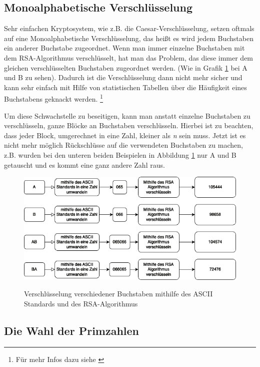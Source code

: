 \documentclass[12pt,a4paper]{scrartcl}
\begin{document}
	\subsection{Monoalphabetische Verschlüsselung}
	Sehr einfachen Kryptosystem, wie z.B. die Caesar-Verschlüsselung, setzen oftmals auf eine Monoalphabetische Verschlüsselung, das heißt es wird jedem Buchstaben ein anderer Buchstabe zugeordnet. Wenn man immer einzelne Buchstaben mit dem RSA-Algorithmus verschlüsselt, hat man das Problem, das diese immer dem gleichen verschlüsselten Buchstaben zugeordnet werden. (Wie in Grafik \ref{fig:figure4} bei A und B zu sehen). Dadurch ist die Verschlüsselung dann nicht mehr sicher und kann sehr einfach mit Hilfe von statistischen Tabellen über die Häufigkeit eines Buchstabens geknackt werden. \footnote{Für mehr Infos dazu siehe \cite{mono}}
	
	Um diese Schwachstelle zu beseitigen, kann man anstatt einzelne Buchstaben zu verschlüsseln, ganze Blöcke an Buchstaben verschlüsseln. Hierbei ist zu beachten, dass jeder Block, umgerechnet in eine Zahl, kleiner als \textit{n} sein muss. Jetzt ist es nicht mehr möglich Rückschlüsse auf die verwendeten Buchstaben zu machen, z.B. wurden bei den unteren beiden Beispielen in Abbildung \ref{fig:figure4} nur A und B getauscht und es kommt eine ganz andere Zahl raus.


\begin{figure}		
\includegraphics[scale=0.45]{rsa_mono} \\
\caption{Verschlüsselung verschiedener Buchstaben mithilfe des ASCII Standards und des RSA-Algorithmus}
\label{fig:figure4}
\end{figure}
	
\subsection{Die Wahl der Primzahlen}
\end{document}
